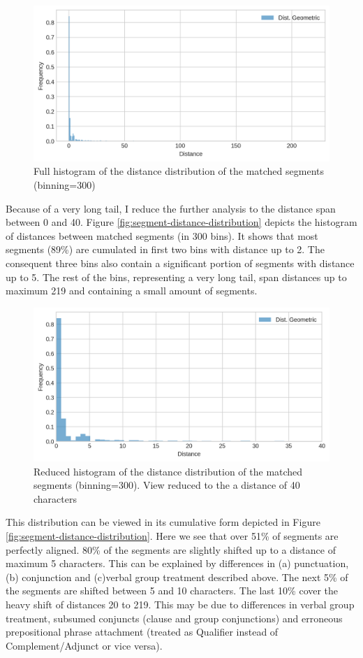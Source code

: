 \begin{figure}[!ht]
    \centering
    \includegraphics[width=.65\textwidth]{evaluation-results/figures/distance-distr-histogram-full}
    \caption{Full histogram of the distance distribution of the matched segments (binning=300)}
    \label{fig:segment-distance-histogram-full}
\end{figure}

    Because of a very long tail, I reduce the further analysis to the distance span between 0 and 40. Figure \ref{fig:segment-distance-distribution} depicts the histogram of distances between matched segments (in 300 bins). It shows that most segments (89\%) are cumulated in first two bins with distance up to 2. The consequent three bins also contain a significant portion of segments with distance up to 5. The rest of the bins, representing a very long tail, span distances up to maximum 219 and containing a small amount of segments. 

    \begin{figure}[!ht]
        \centering
        \includegraphics[width=.65\textwidth]{evaluation-results/figures/distance-distr-histogram}
        \caption{Reduced histogram of the distance distribution of the matched segments (binning=300). View reduced to the a distance of 40 characters}
        \label{fig:segment-distance-histogram}
    \end{figure}

    This distribution can be viewed in its cumulative form depicted in Figure \ref{fig:segment-distance-distribution}. Here we see that over 51\% of segments are perfectly aligned. 80\% of the segments are slightly shifted up to a distance of maximum 5 characters. This can be explained by differences in (a) punctuation, (b) conjunction and (c)verbal group treatment described above. The next 5\% of the segments are shifted between 5 and 10 characters. The last 10\% cover the heavy shift of distances 20 to 219. This may be due to differences in verbal group treatment, subsumed conjuncts (clause and group conjunctions) and erroneous prepositional phrase attachment (treated as Qualifier instead of Complement/Adjunct or vice versa). 

